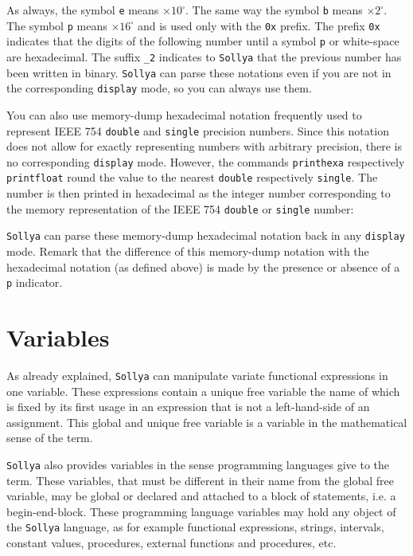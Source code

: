 \documentclass[a4paper]{article}
\newcommand{\com}[1]{\texttt{#1}}
\newcommand{\key}[1]{\texttt{#1}}
\newcommand{\sollya}{\texttt{Sollya}\xspace}
\begin{document}
As always, the symbol \texttt{e} means $\times 10^\square $. The same way the symbol \texttt{b} means  $\times 2^\square $. The symbol \texttt{p} means $\times 16^\square$ and is used only with the \texttt{0x} prefix. The prefix \texttt{0x} indicates that the digits of the following number until 
a symbol \texttt{p} or white-space are hexadecimal. The suffix \texttt{\_2} indicates to \sollya that the previous number has been written in binary. \sollya can parse these notations even if you are not in the corresponding \key{display} mode, so you can always use them.

You can also use memory-dump hexadecimal notation frequently used to represent IEEE 754 \texttt{double} and \texttt{single} precision numbers. Since this notation does not allow for exactly representing numbers with arbitrary precision, there is no corresponding \key{display} mode. However, the commands \com{printhexa} respectively \com{printfloat} round the value to the nearest \texttt{double} respectively \texttt{single}. The number is then printed in hexadecimal as the integer number corresponding to the memory representation of the IEEE 754 \texttt{double} or \texttt{single} number:



\sollya can parse these memory-dump hexadecimal notation back in any
\key{display} mode. Remark that the difference of this memory-dump
notation with the hexadecimal notation (as defined above) is made by
the presence or absence of a \texttt{p} indicator.

\section{Variables}\label{variables}

As already explained, \sollya can manipulate variate functional
expressions in one variable. These expressions contain a unique free variable the name
of which is fixed by its first usage in an expression that is not a
left-hand-side of an assignment. This global and unique free variable is 
a variable in the mathematical sense of the term. 

\sollya also provides variables in the sense programming languages
give to the term.  These variables, that must be different in their
name from the global free variable, may be global or declared and
attached to a block of statements, i.e. a begin-end-block. These
programming language variables may hold any object of the \sollya
language, as for example functional expressions, strings, intervals,
constant values, procedures, external functions and procedures, etc.
\end{document}
